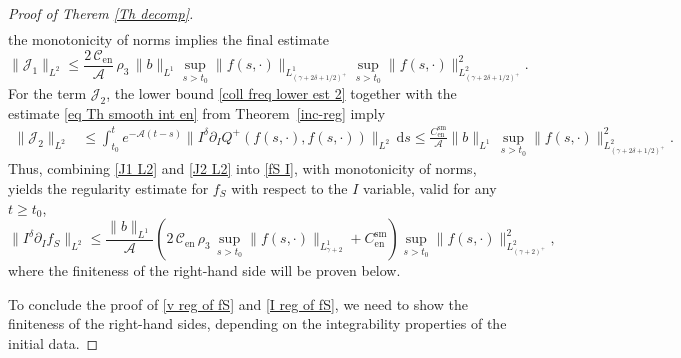 \documentclass[11pt,a4paper]{amsart}
\newcommand{\md}{\mathrm{d}}
\newcommand{\g}{\gamma}
\newcommand{\Ls}{L^1}
\newcommand{\mA}{\mathcal{A}}
\newcommand{\fS}{f_S}
\newcommand{\Csen}{C_{\text{en}}^{\text{sm}}}
\newcommand{\Clen}{\mathcal{C}_{\text{en}}}
\begin{document}
\begin{proof}[Proof of Therem \ref{Th decomp}]
\begin{equation*}
\begin{split}
 	\end{split}
 \end{equation*}
the monotonicity of norms implies the final estimate
\begin{equation}\label{J1 L2}
	\|	\mathcal{J}_1  \|_{L^2} 
		\leq   \frac{2\, \Clen}{\mA}  \, \rho_3 \,  	\| b \|_{\Ls}    \sup_{s>t_0}  \|  	{f}(s,\cdot)    \|_{L^1_{(\g+2\delta+1/2)^+}}  \sup_{s>t_0}  \|  {f}(s,\cdot)    \|^2_{L^2_{(\g+2\delta+1/2)^+}}.
\end{equation}
For the term $\mathcal{J}_2$, the lower bound \eqref{coll freq lower est 2} together with the estimate \eqref{eq Th smooth int en} from Theorem~\ref{inc-reg} imply
\begin{equation}\label{J2 L2}
	\begin{split}
	\|	\mathcal{J}_2  \|_{L^2}  & \leq  \int_{t_0}^t  e^{- \mA (t-s)} \| I^\delta \partial_{I} Q^+(f(s,\cdot),f(s,\cdot)) \|_{L^2}  \, \md s 	 \leq \frac{ \Csen}{\mA} \| b \|_{\Ls} \, \sup_{s>t_0} \| f(s,\cdot)\|^2_{L^2_{(\g+2\delta+1/2)^+}}.
	 \end{split}
\end{equation}
Thus, combining \eqref{J1 L2} and \eqref{J2 L2} into \eqref{fS I}, with monotonicity of norms, yields the regularity estimate for $\fS$ with respect to the $I$ variable, valid for any $t \geq t_0$,
 \begin{equation}\label{I reg of fS}
	\| 	I^\delta \partial_{I}	\fS \|_{L^2} \leq \frac{	\| b \|_{\Ls} }{\mA}  \left(    2\, \Clen  \, \rho_3 \,      \sup_{s>t_0}  \|  	{f}(s,\cdot)    \|_{L^1_{\g+2}} +   \Csen \right) \sup_{s> t_0} \| f(s,\cdot)\|^2_{L^2_{(\g+2)^+}},
\end{equation}
where the finiteness of the right-hand side will be proven below. 

To conclude the proof of \eqref{v reg of fS} and \eqref{I reg of fS}, we need to show the finiteness of the right-hand sides, depending on the integrability properties of the initial data. 


\end{proof}
\end{document}
